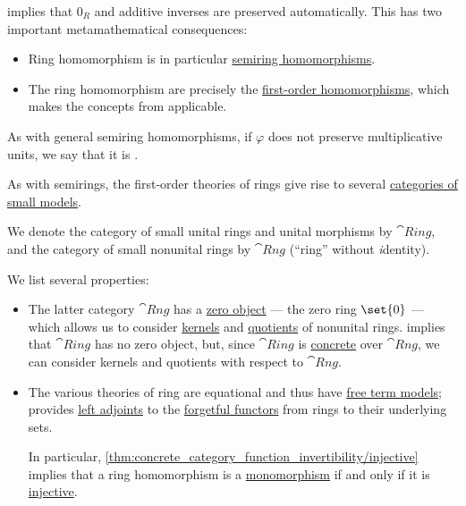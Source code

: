 \begin{definition}
\begin{thmenum}
     implies that \( 0_R \) and additive inverses are preserved automatically. This has two important metamathematical consequences:
    \begin{itemize}
      \item Ring homomorphism is in particular \hyperref[def:semiring/morphism]{semiring homomorphisms}.
      \item The ring homomorphism are precisely the \hyperref[def:fol_homomorphism]{first-order homomorphisms}, which makes the concepts from  applicable.
    \end{itemize}

    As with general semiring homomorphisms, if \( \varphi \) does not preserve multiplicative units, we say that it is .

    \mimprovised As with semirings, the first-order theories of rings give rise to several \hyperref[def:fol_theory_model_functor/obj]{categories of small models}.

    We denote the category of small unital rings and unital morphisms by \( \cat{Ring} \), and the category of small nonunital rings by \( \cat{Rng} \) (\enquote{ring} without \emph{i}dentity).

    We list several properties:
    \begin{itemize}
      \item The latter category \( \cat{Rng} \) has a \hyperref[def:universal_objects/zero]{zero object} --- the zero ring \( \set{ 0 } \) --- which allows us to consider \hyperref[def:categorical_kernels/kernel]{kernels} and \hyperref[def:categorical_quotient_object]{quotients} of nonunital rings.  implies that \( \cat{Ring} \) has no zero object, but, since \( \cat{Ring} \) is \hyperref[def:concrete_category]{concrete} over \( \cat{Rng} \), we can consider kernels and quotients with respect to \( \cat{Rng} \).

      \item The various theories of ring are equational and thus have \hyperref[def:fol_free_term_model]{free term models};  provides \hyperref[def:adjoint_functor]{left adjoints} to the \hyperref[def:fol_theory_forgetful_functor/set]{forgetful functors} from rings to their underlying sets.

      In particular, \cref{thm:concrete_category_function_invertibility/injective} implies that a ring homomorphism is a \hyperref[def:morphism_cancellation/left]{monomorphism} if and only if it is \hyperref[def:function_invertibility/injective]{injective}.


\end{itemize}
\end{thmenum}
\end{definition}
